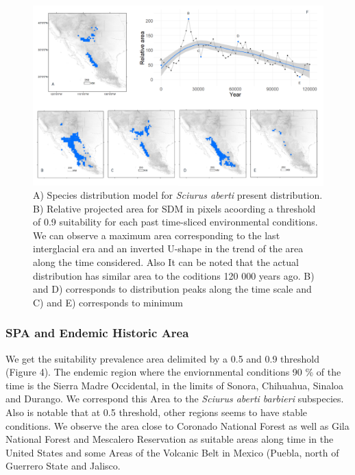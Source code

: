 \documentclass[
]{article}
\begin{document}
\begin{figure}
\centering
\includegraphics[width=1\textwidth,height=\textheight]{all_figures/figure_3.png}
\caption{A) Species distribution model for \emph{Sciurus aberti} present
distribution. B) Relative projected area for SDM in pixels acoording a
threshold of 0.9 suitability for each past time-sliced environmental
conditions. We can observe a maximum area corresponding to the last
interglacial era and an inverted U-shape in the trend of the area along
the time considered. Also It can be noted that the actual distribution
has similar area to the coditions 120 000 years ago. B) and D)
corresponds to distribution peaks along the time scale and C) and E)
corresponds to minimum}
\end{figure}

\hypertarget{spa-and-endemic-historic-area}{%
\subsubsection{SPA and Endemic Historic
Area}\label{spa-and-endemic-historic-area}}

We get the suitability prevalence area delimited by a 0.5 and 0.9
threshold (Figure 4). The endemic region where the enviornmental
conditions 90 \% of the time is the Sierra Madre Occidental, in the
limits of Sonora, Chihuahua, Sinaloa and Durango. We correspond this
Area to the \emph{Sciurus aberti barbieri} subspecies. Also is notable
that at 0.5 threshold, other regions seems to have stable conditions. We
observe the area close to Coronado National Forest as well as Gila
National Forest and Mescalero Reservation as suitable areas along time
in the United States and some Areas of the Volcanic Belt in Mexico
(Puebla, north of Guerrero State and Jalisco.\\
\end{document}
